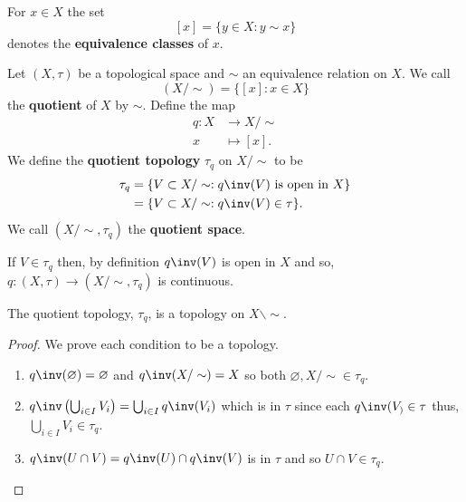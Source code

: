 \documentclass[12pt, a4paper]{article}
\begin{document}
\begin{definition}
   For \(x \in X\) the set 
   \[[x] = \{y \in X : y \sim x\}\] 
   denotes the \textbf{equivalence classes} of \(x\).
\end{definition}

\begin{definition}
    Let \((X,\tau)\) be a topological space and \(\sim\) an equivalence relation on \(X\). We call 
    \[(X/\sim) = \{[x] : x \in X\}\]
    the \textbf{quotient} of \(X\) by \(\sim\). Define the map 
    \[\begin{aligned}
        q : X &\to X/ \sim \\
        x &\mapsto [x].
    \end{aligned}\]
    We define the \textbf{quotient topology} \(\tau_q\) on \(X /\sim\) to be 
    \[\begin{aligned}
        \tau_q &= \{V \subset X / \sim : q\inv(V) \text{ is open in } X\} \\
        &= \{V \subset X / \sim : q\inv(V) \in \tau\}.
    \end{aligned}\]
    We call \((X/\sim,\tau_q)\) the \textbf{quotient space}.
\end{definition}

\begin{mdremark}
    If \(V \in \tau_q\) then, by definition \(q\inv(V)\) is open in \(X\) and so, \(q : (X,\tau) \to (X/\sim, \tau_q)\) is continuous.
\end{mdremark}

\begin{lemma}
    The quotient topology, \(\tau_q\), is a topology on \(X \backslash \sim\).
\end{lemma}

\begin{proof}
    We prove each condition to be a topology.
    \begin{enumerate}
        \item \(q\inv(\varnothing) =\varnothing\) and \(q\inv(X /\sim)=X\) so both \(\varnothing, X/\sim \in \tau_q\).
        \item \(q\inv\left( \bigcup_{i \in I} V_i \right) = \bigcup_{i \in I} q\inv(V_i)\) which is in \(\tau\) since each \(q\inv(V_)\in\tau\) thus, \(\bigcup_{i \in I} V_i \in \tau_q\).
        \item \(q\inv( U \cap V) = q\inv(U) \cap q\inv(V)\) is in \(\tau\) and so \(U\cap V \in \tau_q\).
    \end{enumerate}
\end{proof}
\end{document}
